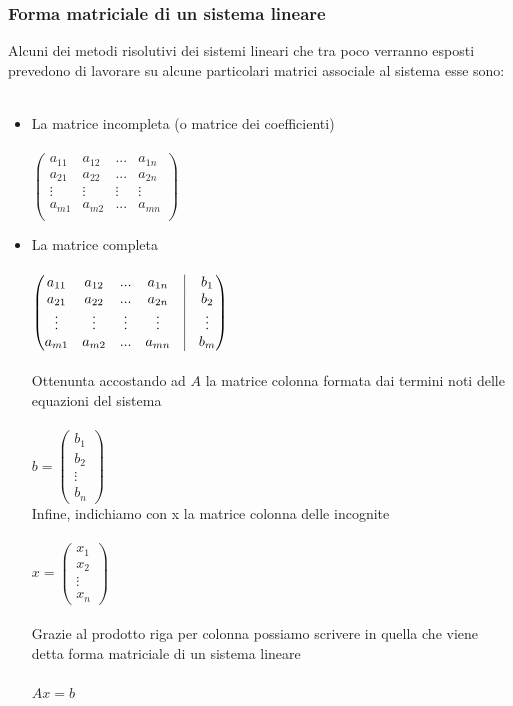 \documentclass{report}
\begin{document}
\subsubsection{Forma matriciale di un sistema lineare}
Alcuni dei metodi risolutivi dei sistemi lineari che tra poco verranno esposti prevedono di lavorare su alcune particolari matrici associale al sistema esse sono:
\\
\\
\begin{itemize}
  \item La matrice incompleta (o matrice dei coefficienti)
    \\
    \\
    $\begin{pmatrix}
      a_{11} & a_{12} & ... & a_{1n} \\
      a_{21} & a_{22} & ... & a_{2n} \\
      \vdots & \vdots & \vdots & \vdots \\
      a_{m1} & a_{m2} & ... & a_{mn} \\
    \end{pmatrix}$
  \item La matrice completa
    \\
    \\
    $\begin{pmatrix}
      a_{11} & a_{12} & ... & a_{1n}  & \vline & b_1\\
      a_{21} & a_{22} & ... & a_{2n}  & \vline & b_2\\
      \vdots & \vdots & \vdots & \vdots & \vline & \vdots\\
      a_{m1} & a_{m2} & ... & a_{mn} & \vline & b_m\\
    \end{pmatrix}$
    \\
    \\
    Ottenunta accostando ad $A$ la matrice colonna formata dai termini noti delle equazioni del sistema 
    \\
    \\
    $b = \begin{pmatrix}
      b_1 \\
      b_2 \\
      \vdots \\
      b_n
    \end{pmatrix}$
    \\
    Infine, indichiamo con x la matrice colonna delle incognite
    \\
    \\
    $x = \begin{pmatrix}
      x_1 \\
      x_2 \\
      \vdots \\
      x_n
    \end{pmatrix}$
\\
\\
Grazie al prodotto riga per colonna possiamo scrivere in quella che viene detta forma matriciale di un sistema lineare
\\
\\
$Ax = b$


\end{itemize} 
\end{document}
